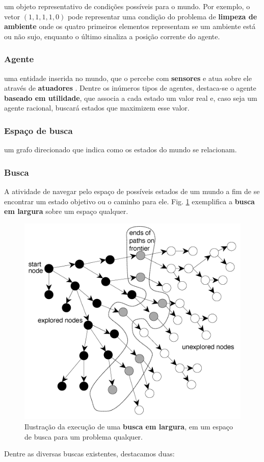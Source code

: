 \documentclass[twoside,conference,a4paper,12px]{IEEEtran}
\begin{document}
um objeto representativo de condições possíveis para o mundo. Por exemplo, o vetor $(1, 1, 1, 1, 0)$ pode representar uma condição do problema de \textbf{limpeza de ambiente} onde os quatro primeiros elementos representam se um ambiente está ou não sujo, enquanto o último sinaliza a posição corrente do agente.

\subsubsection{Agente}

uma entidade inserida no mundo, que o percebe com \textbf{sensores} e atua sobre ele através de \textbf{atuadores} \cite{russell2003artificial}. Dentre os inúmeros tipos de agentes, destaca-se o agente \textbf{baseado em utilidade}, que associa a cada estado um valor real e, caso seja um agente racional, buscará estados que maximizem esse valor.

\subsubsection{Espaço de busca}

um grafo direcionado que indica como os estados do mundo se relacionam.

\subsubsection{Busca}

A atividade de navegar pelo espaço de possíveis estados de um mundo a fim de se encontrar um estado objetivo ou o caminho para ele. Fig. \ref{fig:ex_search} exemplifica a \textbf{busca em largura} sobre um espaço qualquer.

\begin{figure}[!ht]
	\centering
	\includegraphics[width=.3\textwidth]{assets/ex_search}
	\caption{Ilustração da execução de uma \textbf{busca em largura}, em um espaço de busca para um problema qualquer.}
	\label{fig:ex_search}
\end{figure}

Dentre as diversas buscas existentes, destacamos duas:
\end{document}
